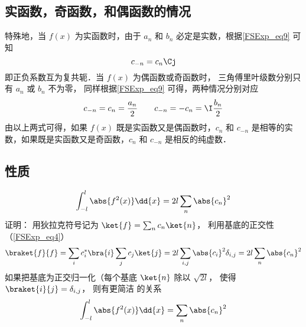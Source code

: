 \subsection{实函数，奇函数，和偶函数的情况}
特殊地，当 $f(x)$ 为实函数时，由于 $a_n$ 和 $b_n$ 必定是实数，根据\autoref{FSExp_eq9} 可知
\begin{equation}
c_{-n} = c_{n}\Cj
\end{equation}
即正负系数互为复共轭．当 $f(x)$ 为偶函数或奇函数时， 三角傅里叶级数分别只有 $a_n$ 或 $b_n$ 不为零， 同样根据\autoref{FSExp_eq9} 可得，两种情况分别对应
\begin{equation}
c_{-n} = c_n =\frac{a_n}{2} \qquad
c_{-n} = -c_n = \I \frac{b_n}{2}
\end{equation}
由以上两式可得，如果 $f(x)$ 既是实函数又是偶函数时，$c_n$ 和 $c_{-n}$ 是相等的实数，如果既是实函数又是奇函数，$c_n$ 和 $c_{-n}$ 是相反的纯虚数．

\subsection{性质}
\begin{equation}
\int_{-l}^l \abs{f^2(x)} \dd{x} =  2l\sum_n \abs{c_n}^2
\end{equation}
证明： 用狄拉克符号记为 $\ket{f} = \sum_n c_n \ket{n}$， 利用基底的正交性（\autoref{FSExp_eq4}）
\begin{equation}
\braket{f}{f} = \sum_i c_i^* \bra{i} \sum_j c_j \ket{j} = 2l \sum_{i,j} \abs{c_i}^2 \delta_{i,j} = 2l \sum_n \abs{c_n}^2
\end{equation}
如果把基底为正交归一化（每个基底 $\ket{n}$ 除以 $\sqrt{2l}$， 使得 $\braket{i}{j} = \delta_{i,j}$， 则有更简洁 \abcd 的关系
\begin{equation}
\int_{-l}^l \abs{f^2(x)} \dd{x} =  \sum_n \abs{c_n}^2
\end{equation}
